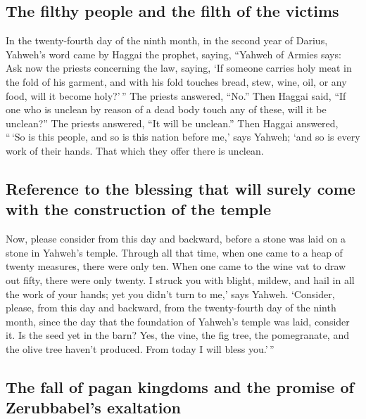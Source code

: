 \hypertarget{the-filthy-people-and-the-filth-of-the-victims}{%
\subsection{The filthy people and the filth of the
victims}\label{the-filthy-people-and-the-filth-of-the-victims}}

 In the twenty-fourth day of the ninth month, in the
second year of Darius, Yahweh's word came by Haggai the prophet, saying,
 ``Yahweh of Armies says: Ask now the priests concerning
the law, saying,  `If someone carries holy meat in the
fold of his garment, and with his fold touches bread, stew, wine, oil,
or any food, will it become holy?'\,'' The priests answered, ``No.''
 Then Haggai said, ``If one who is unclean by reason of a
dead body touch any of these, will it be unclean?'' The priests
answered, ``It will be unclean.''  Then Haggai answered,
``\,`So is this people, and so is this nation before me,' says Yahweh;
`and so is every work of their hands. That which they offer there is
unclean.

\hypertarget{reference-to-the-blessing-that-will-surely-come-with-the-construction-of-the-temple}{%
\subsection{Reference to the blessing that will surely come with the
construction of the
temple}\label{reference-to-the-blessing-that-will-surely-come-with-the-construction-of-the-temple}}

 Now, please consider from this day and backward, before
a stone was laid on a stone in Yahweh's temple.  Through
all that time, when one came to a heap of twenty measures, there were
only ten. When one came to the wine vat to draw out fifty, there were
only twenty.  I struck you with blight, mildew, and hail
in all the work of your hands; yet you didn't turn to me,' says Yahweh.
 `Consider, please, from this day and backward, from the
twenty-fourth day of the ninth month, since the day that the foundation
of Yahweh's temple was laid, consider it.  Is the seed
yet in the barn? Yes, the vine, the fig tree, the pomegranate, and the
olive tree haven't produced. From today I will bless you.'\,''

\hypertarget{the-fall-of-pagan-kingdoms-and-the-promise-of-zerubbabels-exaltation}{%
\subsection{The fall of pagan kingdoms and the promise of Zerubbabel's
exaltation}\label{the-fall-of-pagan-kingdoms-and-the-promise-of-zerubbabels-exaltation}}

